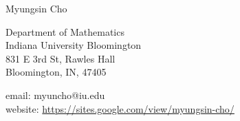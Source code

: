 \documentclass{article}
\begin{document}
\begin{center}
{\LARGE Myungsin Cho} \\[2pc]
\end{center}
\begin{minipage}[c]{0.4\linewidth}
Department of Mathematics\\ 
Indiana University Bloomington\\
831 E 3rd St, Rawles Hall \\
Bloomington, IN, 47405
\end{minipage} %
\begin{minipage}[c]{0.6\linewidth}
email:  myuncho@iu.edu \\
website: \url{https://sites.google.com/view/myungsin-cho/} \\
\\
\end{minipage}  \\[.5pc]
\end{document}
